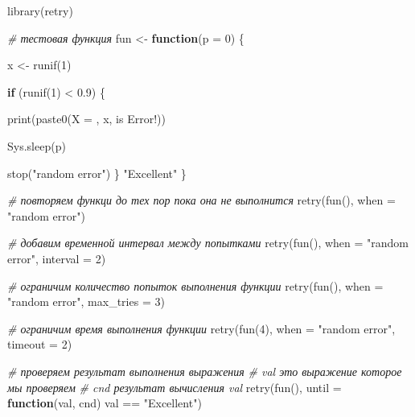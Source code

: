 \documentclass[
]{book}
\newenvironment{Shaded}{\begin{snugshade}}{\end{snugshade}}
\newcommand{\AttributeTok}[1]{\textcolor[rgb]{0.77,0.63,0.00}{#1}}
\newcommand{\CommentTok}[1]{\textcolor[rgb]{0.56,0.35,0.01}{\textit{#1}}}
\newcommand{\ControlFlowTok}[1]{\textcolor[rgb]{0.13,0.29,0.53}{\textbf{#1}}}
\newcommand{\DecValTok}[1]{\textcolor[rgb]{0.00,0.00,0.81}{#1}}
\newcommand{\FloatTok}[1]{\textcolor[rgb]{0.00,0.00,0.81}{#1}}
\newcommand{\FunctionTok}[1]{\textcolor[rgb]{0.00,0.00,0.00}{#1}}
\newcommand{\NormalTok}[1]{#1}
\newcommand{\OtherTok}[1]{\textcolor[rgb]{0.56,0.35,0.01}{#1}}
\newcommand{\SpecialCharTok}[1]{\textcolor[rgb]{0.00,0.00,0.00}{#1}}
\newcommand{\StringTok}[1]{\textcolor[rgb]{0.31,0.60,0.02}{#1}}
\begin{document}
\begin{Shaded}
\begin{Highlighting}[]
\FunctionTok{library}\NormalTok{(retry)}

\CommentTok{\# тестовая функция }
\NormalTok{fun }\OtherTok{\textless{}{-}} \ControlFlowTok{function}\NormalTok{(}\AttributeTok{p =} \DecValTok{0}\NormalTok{) \{}
  
\NormalTok{  x }\OtherTok{\textless{}{-}} \FunctionTok{runif}\NormalTok{(}\DecValTok{1}\NormalTok{)}
  
  \ControlFlowTok{if}\NormalTok{ (}\FunctionTok{runif}\NormalTok{(}\DecValTok{1}\NormalTok{) }\SpecialCharTok{\textless{}} \FloatTok{0.9}\NormalTok{) \{}
    
    \FunctionTok{print}\NormalTok{(}\FunctionTok{paste0}\NormalTok{(}\StringTok{\textquotesingle{}X = \textquotesingle{}}\NormalTok{, x, }\StringTok{\textquotesingle{} is Error!\textquotesingle{}}\NormalTok{))}
    
    \FunctionTok{Sys.sleep}\NormalTok{(p)}
          
    \FunctionTok{stop}\NormalTok{(}\StringTok{"random error"}\NormalTok{)}
\NormalTok{  \}}
  \StringTok{"Excellent"}
\NormalTok{\}}

\CommentTok{\# повторяем функци до тех пор пока она не выполнится}
\FunctionTok{retry}\NormalTok{(}\FunctionTok{fun}\NormalTok{(), }\AttributeTok{when =} \StringTok{"random error"}\NormalTok{)}

\CommentTok{\# добавим временной интервал между попытками}
\FunctionTok{retry}\NormalTok{(}\FunctionTok{fun}\NormalTok{(), }\AttributeTok{when =} \StringTok{"random error"}\NormalTok{, }\AttributeTok{interval =} \DecValTok{2}\NormalTok{)}

\CommentTok{\# ограничим количество попыток выполнения функции}
\FunctionTok{retry}\NormalTok{(}\FunctionTok{fun}\NormalTok{(), }\AttributeTok{when =} \StringTok{"random error"}\NormalTok{, }\AttributeTok{max\_tries =} \DecValTok{3}\NormalTok{)}

\CommentTok{\# ограничим время выполнения функции}
\FunctionTok{retry}\NormalTok{(}\FunctionTok{fun}\NormalTok{(}\DecValTok{4}\NormalTok{), }\AttributeTok{when =} \StringTok{"random error"}\NormalTok{, }\AttributeTok{timeout =} \DecValTok{2}\NormalTok{)}

\CommentTok{\# проверяем результат выполнения выражения}
\CommentTok{\# val это выражение которое мы проверяем}
\CommentTok{\# cnd результат вычисления val}
\FunctionTok{retry}\NormalTok{(}\FunctionTok{fun}\NormalTok{(), }\AttributeTok{until =} \ControlFlowTok{function}\NormalTok{(val, cnd) val }\SpecialCharTok{==} \StringTok{"Excellent"}\NormalTok{)}


\end{Highlighting}
\end{Shaded}
\end{document}
